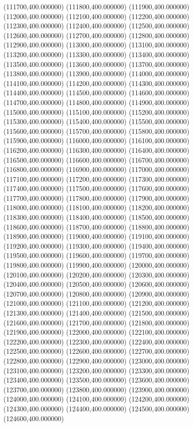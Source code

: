 (111700,400.000000)
(111800,400.000000)
(111900,400.000000)
(112000,400.000000)
(112100,400.000000)
(112200,400.000000)
(112300,400.000000)
(112400,400.000000)
(112500,400.000000)
(112600,400.000000)
(112700,400.000000)
(112800,400.000000)
(112900,400.000000)
(113000,400.000000)
(113100,400.000000)
(113200,400.000000)
(113300,400.000000)
(113400,400.000000)
(113500,400.000000)
(113600,400.000000)
(113700,400.000000)
(113800,400.000000)
(113900,400.000000)
(114000,400.000000)
(114100,400.000000)
(114200,400.000000)
(114300,400.000000)
(114400,400.000000)
(114500,400.000000)
(114600,400.000000)
(114700,400.000000)
(114800,400.000000)
(114900,400.000000)
(115000,400.000000)
(115100,400.000000)
(115200,400.000000)
(115300,400.000000)
(115400,400.000000)
(115500,400.000000)
(115600,400.000000)
(115700,400.000000)
(115800,400.000000)
(115900,400.000000)
(116000,400.000000)
(116100,400.000000)
(116200,400.000000)
(116300,400.000000)
(116400,400.000000)
(116500,400.000000)
(116600,400.000000)
(116700,400.000000)
(116800,400.000000)
(116900,400.000000)
(117000,400.000000)
(117100,400.000000)
(117200,400.000000)
(117300,400.000000)
(117400,400.000000)
(117500,400.000000)
(117600,400.000000)
(117700,400.000000)
(117800,400.000000)
(117900,400.000000)
(118000,400.000000)
(118100,400.000000)
(118200,400.000000)
(118300,400.000000)
(118400,400.000000)
(118500,400.000000)
(118600,400.000000)
(118700,400.000000)
(118800,400.000000)
(118900,400.000000)
(119000,400.000000)
(119100,400.000000)
(119200,400.000000)
(119300,400.000000)
(119400,400.000000)
(119500,400.000000)
(119600,400.000000)
(119700,400.000000)
(119800,400.000000)
(119900,400.000000)
(120000,400.000000)
(120100,400.000000)
(120200,400.000000)
(120300,400.000000)
(120400,400.000000)
(120500,400.000000)
(120600,400.000000)
(120700,400.000000)
(120800,400.000000)
(120900,400.000000)
(121000,400.000000)
(121100,400.000000)
(121200,400.000000)
(121300,400.000000)
(121400,400.000000)
(121500,400.000000)
(121600,400.000000)
(121700,400.000000)
(121800,400.000000)
(121900,400.000000)
(122000,400.000000)
(122100,400.000000)
(122200,400.000000)
(122300,400.000000)
(122400,400.000000)
(122500,400.000000)
(122600,400.000000)
(122700,400.000000)
(122800,400.000000)
(122900,400.000000)
(123000,400.000000)
(123100,400.000000)
(123200,400.000000)
(123300,400.000000)
(123400,400.000000)
(123500,400.000000)
(123600,400.000000)
(123700,400.000000)
(123800,400.000000)
(123900,400.000000)
(124000,400.000000)
(124100,400.000000)
(124200,400.000000)
(124300,400.000000)
(124400,400.000000)
(124500,400.000000)
(124600,400.000000)
